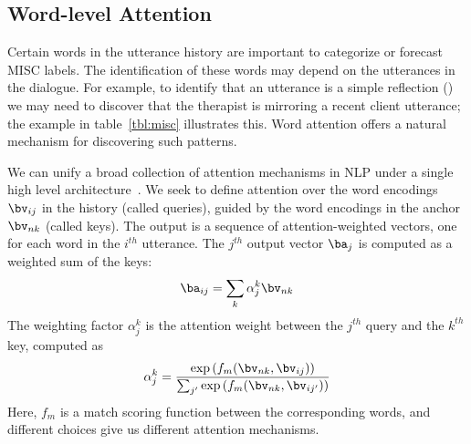 \subsection{Word-level Attention}
\label{ssec:word_att}

Certain words in the utterance history are important to categorize or
forecast MISC labels. The identification of these words may depend on
the utterances in the dialogue. For example, to identify that an
utterance is a simple reflection (\RES) we may need to discover that
the therapist is mirroring a recent client utterance; the example
in table~\ref{tbl:misc} illustrates this. Word attention offers a
natural mechanism for discovering such patterns.


We can unify a broad collection of attention mechanisms in NLP under
a single high level architecture~\cite{galassi2019attention}. We
seek to define attention over the word encodings $\bv_{ij}$ in the
history (called queries), guided by the word encodings in the anchor
$\bv_{nk}$ (called keys). The output is a sequence of
attention-weighted vectors, one for each word in the $i^{th}$
utterance.  The $j^{th}$ output vector $\ba_j$ is computed as a
weighted sum of the keys:
\begin{equation}
  \ba_{ij} = \sum_{k} \alpha^{k}_{j} \bv_{nk}
\label{eq:att_sum}
\end{equation}
The weighting factor $\alpha^k_j$ is the attention weight between
the $j^{th}$ query and the $k^{th}$ key, computed as
\begin{equation}
\label{eq:att_weight}
\alpha^{k}_{j} = \frac{\exp\left(f_{m}(\bv_{nk}, \bv_{ij})\right)}{\sum_{j^{\prime}} \exp\left(f_{m}(\bv_{nk}, \bv_{ij^\prime})\right)}
\end{equation}
Here, $f_m$ is a match scoring function between the corresponding
words, and different choices give us different attention mechanisms.

